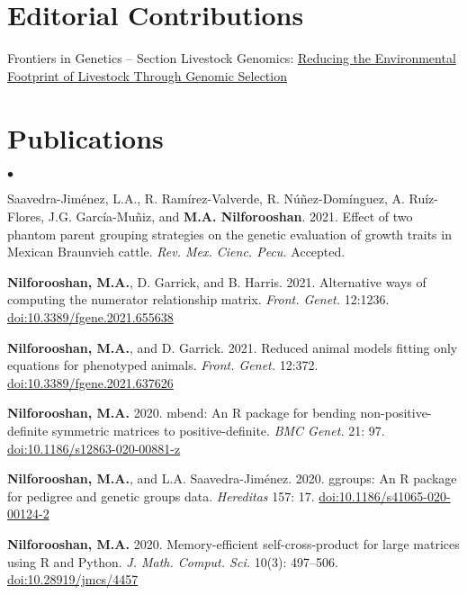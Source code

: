 \documentclass[margin,line]{res}
\newenvironment{list2}{
  \begin{list}{$\bullet$}{%
      \setlength{\itemsep}{0in}
      \setlength{\parsep}{0in} \setlength{\parskip}{0in}
      \setlength{\topsep}{0in} \setlength{\partopsep}{0in}
      \setlength{\leftmargin}{0.2in}}}{\end{list}}
\begin{document}
\begin{resume}
\section{\sc Editorial Contributions}

Frontiers in Genetics -- Section Livestock Genomics: \href{https://www.frontiersin.org/research-topics/24065/reducing-the-environmental-footprint-of-livestock-through-genomic-selection}{Reducing the Environmental Footprint of Livestock Through Genomic Selection}
\section{\sc Publications}

\begin{list2}

\item Saavedra-Jim\'{e}nez, L.A., R. Ram\'{i}rez-Valverde, R. N\'{u}\~{n}ez-Dom\'{i}nguez, A. Ru\'{i}z-Flores, J.G. Garc\'{i}a-Mu\~{n}iz, and {\bf M.A. Nilforooshan}. 2021. Effect of two phantom parent grouping strategies on the genetic evaluation of growth traits in Mexican Braunvieh cattle. {\em Rev. Mex. Cienc. Pecu.} Accepted.
\item {\bf Nilforooshan, M.A.}, D. Garrick, and B. Harris. 2021. Alternative ways of computing the numerator relationship matrix. {\em Front. Genet.} 12:1236. \href{https://www.frontiersin.org/articles/10.3389/fgene.2021.655638}{doi:10.3389/fgene.2021.655638}
\item {\bf Nilforooshan, M.A.}, and D. Garrick. 2021. Reduced animal models fitting only equations for phenotyped animals. {\em Front. Genet.} 12:372. \href{https://www.frontiersin.org/article/10.3389/fgene.2021.637626}{doi:10.3389/fgene.2021.637626}
\item {\bf Nilforooshan, M.A.} 2020. mbend: An R package for bending non-positive-deﬁnite symmetric matrices to positive-deﬁnite. {\em BMC Genet.} 21: 97. \href{https://doi.org/10.1186/s12863-020-00881-z}{doi:10.1186/s12863-020-00881-z}
\item {\bf Nilforooshan, M.A.}, and L.A. Saavedra-Jim\'{e}nez. 2020. ggroups: An R package for pedigree and genetic groups data. {\em Hereditas} 157: 17. \href{https://doi.org/10.1186/s41065-020-00124-2}{doi:10.1186/s41065-020-00124-2}
\item {\bf Nilforooshan, M.A.} 2020. Memory-efficient self-cross-product for large matrices using R and Python. {\em J. Math. Comput. Sci.} 10(3): 497--506. \href{https://doi.org/10.28919/jmcs/4457}{doi:10.28919/jmcs/4457}

\end{list2}
\end{resume}
\end{document}

